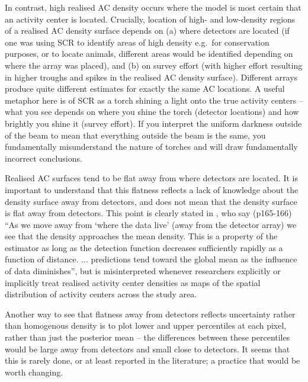 \documentclass[useAMS,usenatbib,referee]{biom}
\begin{document}
In contrast, high realised AC density occurs where the model is most certain that an activity center is located. Crucially, location of high- and low-density regions of a realised AC density surface depends on (a) where detectors are located (if one was using SCR to identify areas of high density e.g.\ for conservation purposes, or to locate animals, different areas would be identified depending on where the array was placed), and (b) on survey effort (with higher effort resulting in higher troughs and spikes in the realised AC density surface). Different arrays produce quite different estimates for exactly the same AC locations. A useful metaphor here is of SCR as a torch shining a light onto the true activity centers -- what you see depends on where you shine the torch (detector locations) and how brightly you shine it (survey effort). If you interpret the uniform darkness outside of the beam to mean that everything outside the beam is the same, you fundamentally misunderstand the nature of torches and will draw fundamentally incorrect conclusions.

Realised AC surfaces tend to be flat away from where detectors are located. It is important to understand that this flatness reflects a lack of knowledge about the density surface away from detectors, and does not mean that the density surface is flat away from detectors. This point is clearly stated in \cite{Royle+al:13a}, who say (p165-166) ``As we move away from `where the data live' (away from the detector array) we see that the density approaches the mean density. This is a property of the estimator as long as the detection function decreases sufficiently rapidly as a function of distance. ... predictions tend toward the global mean as the influence of data diminishes'', but is misinterpreted whenever researchers explicitly or implicitly treat realised activity center densities as maps of the spatial distribution of activity centers across the study area. %

Another way to see that flatness away from detectors reflects uncertainty rather than homogenous density is to plot lower and upper percentiles at each pixel, rather than just the posterior mean -- the differences between these percentiles would be large away from detectors and small close to detectors. It seems that this is rarely done, or at least reported in the literature; a practice that would be worth changing. 
\end{document}
